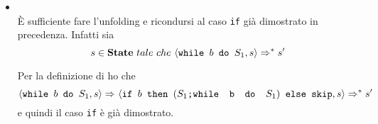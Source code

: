 {\begin{itemize}
\begin{itemize}
		Sia 
		\[ y\notin\lvar{\ifABC{b}{$S_1$}{$S_2$}} \]
		allora, per definizione di 
		\texttt{lvar}, 
		\[ y\notin\lvar{$S_1$} \cup \lvar{$S_2$} \]
		 e quindi in
		particolare 
		$y\notin\lvar{$S_1$}$. Per \hi vale quindi
		$s(y)=s'(y)$.

		\item {}: è analogo al precedente. 
		Nel caso in cui la
		valutazione della guardia nello stato $s$ si falsa, allora 
	\[ \confSs{\ifABC{b}{S_1}{S_2}}{s}\Rar{}\confSs{S_2}{s} \]
		sul quale so che
		vale l'\hi{}, poichè per ipotesi 
		\[ \confSs{\ifABC{b}{S_1}{S_2}}{s}\Rar{*}s'\]
		 di conseguenza 
		 	\[ \exists~k\in 	\mathbb{N}~tale~che~\confSs{\ifABC{b}{S_1}{S_2}}{s}\Rar{k}s' \]
		 e quindi 
	\[ 	\confSs{\ifABC{b}{S_1}{S_2}}{s}\Rar{}\confSs{S_2}{s}\Rar{k-1}s' \].
		 
		Sia $y\notin\lvar{\ifABC{b}{$S_1$}{$S_2$}}$ allora, per definizione di 
		\texttt{lvar}, $y\notin\lvar{$S_1$} \cup \lvar{$S_2$}$ e quindi in
		particolare $y\notin\lvar{$S_2$}$. Per ipotesi induttiva vale quindi
		$s(y)=s'(y)$.
		\end{itemize}

	\item {}
	\casespace
	\\
	\`{E} sufficiente fare l'unfolding e
	ricondursi al caso \texttt{if} già dimostrato in precedenza. 
	Infatti sia 
\[ 	s\in\mbox{\textbf{State}}~tale~che~\langle{}\mbox{\normalfont{\texttt{while }}} b \textrm{\normalfont{\texttt{ do }}} S_1, s\rangle{}\Rightarrow^{*}s' \]
	
	Per la definizione
	di \whileSOS{} ho che 
\[ 	\langle{}\mbox{\normalfont{\texttt{while }}} b \textrm{\normalfont{\texttt{ do }}} S_1, s\rangle{}\Rightarrow^{}
	\langle{}\mbox{\normalfont{\texttt{if }}} b \textrm{\normalfont{\texttt{ then }}} (\textrm{\normalfont{\texttt{$S_1$;\mbox{\normalfont{\texttt{while }}} b \textrm{\normalfont{\texttt{ do }}} $S_1$}}}) \textrm{\normalfont{\texttt{ else }}} \textrm{\normalfont{\texttt{skip}}}, s\rangle{}\Rightarrow^{*}s' \]
	e quindi il caso \texttt{if} è già dimostrato.
	\end{itemize}
}

\newpage